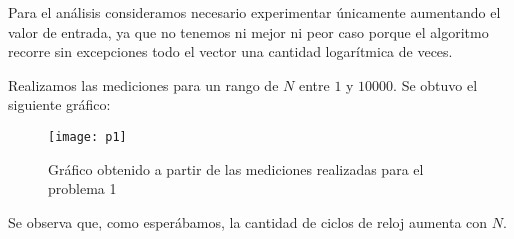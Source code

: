 
Para el análisis consideramos necesario experimentar únicamente aumentando el valor de entrada, ya que no tenemos ni mejor ni peor caso porque el algoritmo recorre sin excepciones todo el vector una cantidad logarítmica de veces. 

Realizamos las mediciones para un rango de $N$ entre $1$ y $10000$. Se obtuvo el siguiente gráfico:

\begin{figure}[h]
\texttt{[image: p1]}
\caption{Gráfico obtenido a partir de las mediciones realizadas para el problema 1}
\end{figure}

Se observa que, como esperábamos, la cantidad de ciclos de reloj aumenta con $N$.
